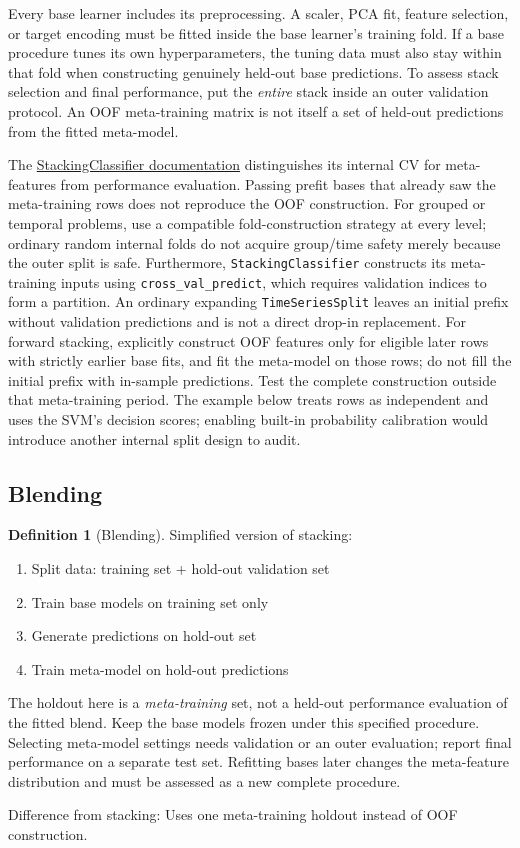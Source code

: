 \documentclass[11pt,twoside]{article}
\numberwithin{equation}{section}
\theoremstyle{plain}
\theoremstyle{definition}
\newtheorem{definition}[theorem]{Definition}
\theoremstyle{remark}
\begin{document}
Every base learner includes its preprocessing. A scaler, PCA fit, feature selection, or target encoding must be fitted inside the base learner's training fold. If a base procedure tunes its own hyperparameters, the tuning data must also stay within that fold when constructing genuinely held-out base predictions. To assess stack selection and final performance, put the \emph{entire} stack inside an outer validation protocol. An OOF meta-training matrix is not itself a set of held-out predictions from the fitted meta-model.

The \href{https://scikit-learn.org/stable/modules/generated/sklearn.ensemble.StackingClassifier.html}{StackingClassifier documentation} distinguishes its internal CV for meta-features from performance evaluation. Passing prefit bases that already saw the meta-training rows does not reproduce the OOF construction. For grouped or temporal problems, use a compatible fold-construction strategy at every level; ordinary random internal folds do not acquire group/time safety merely because the outer split is safe.
Furthermore, \texttt{StackingClassifier} constructs its meta-training inputs
using \texttt{cross\_val\_predict}, which requires validation indices to form
a partition. An ordinary expanding \texttt{TimeSeriesSplit} leaves an initial
prefix without validation predictions and is not a direct drop-in replacement.
For forward stacking, explicitly construct OOF features only for eligible later
rows with strictly earlier base fits, and fit the meta-model on those rows;
do not fill the initial prefix with in-sample predictions. Test the complete
construction outside that meta-training period. The example below treats rows
as independent and uses the SVM's decision scores; enabling built-in probability
calibration would introduce another internal split design to audit.


\subsection{Blending}

\begin{definition}[Blending]
Simplified version of stacking:
\begin{enumerate}
\item Split data: training set + hold-out validation set
\item Train base models on training set only
\item Generate predictions on hold-out set
\item Train meta-model on hold-out predictions
\end{enumerate}

The holdout here is a \emph{meta-training} set, not a held-out performance evaluation of the fitted blend. Keep the base models frozen under this specified procedure. Selecting meta-model settings needs validation or an outer evaluation; report final performance on a separate test set. Refitting bases later changes the meta-feature distribution and must be assessed as a new complete procedure.

Difference from stacking: Uses one meta-training holdout instead of OOF construction.
\end{definition}
\end{document}
